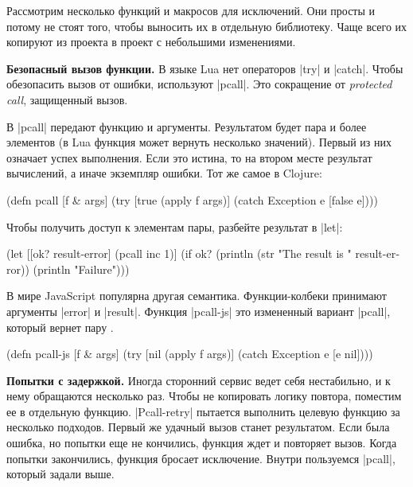 Рассмотрим несколько функций и макросов для исключений. Они просты и потому не
стоят того, чтобы выносить их в отдельную библиотеку. Чаще всего их копируют из
проекта в проект с небольшими изменениями.

\textbf{Безопасный вызов функции.} В языке Lua нет операторов \spverb|try| и
\spverb|catch|. Чтобы обезопасить вызов от ошибки, используют
\spverb|pcall|. Это сокращение от
\emph{protected call}, защищенный вызов.

В \spverb|pcall| передают функцию и аргументы. Результатом будет пара и более
элементов (в Lua функция может вернуть несколько значений). Первый из них
означает успех выполнения. Если это истина, то на втором месте результат
вычислений, а иначе экземпляр ошибки. Тот же самое в Clojure:

\begin{english}
  \begin{clojure}
(defn pcall [f & args]
  (try
    [true (apply f args)]
    (catch Exception e [false e])))
  \end{clojure}
\end{english}

Чтобы получить доступ к элементам пары, разбейте результат в \spverb|let|:

\begin{english}
  \begin{clojure}
(let [[ok? result-error] (pcall inc 1)]
  (if ok?
    (println (str "The result is " result-error))
    (println "Failure")))
  \end{clojure}
\end{english}

В мире JavaScript популярна другая семантика. Функции-колбеки принимают
аргументы \spverb|error| и \spverb|result|. Функция \spverb|pcall-js| это
измененный вариант \spverb|pcall|, который вернет пару .

\begin{english}
  \begin{clojure}
(defn pcall-js [f & args]
  (try
    [nil (apply f args)]
    (catch Exception e [e nil])))
  \end{clojure}
\end{english}

\textbf{Попытки с задержкой.} Иногда сторонний сервис ведет себя нестабильно, и
к нему обращаются несколько раз. Чтобы не копировать логику повтора, поместим ее
в отдельную функцию. \spverb|Pcall-retry| пытается выполнить целевую функцию за
несколько подходов. Первый же удачный вызов станет результатом. Если была
ошибка, но попытки еще не кончились, функция ждет и повторяет вызов. Когда
попытки закончились, функция бросает исключение. Внутри пользуемся
\spverb|pcall|, который задали выше.

